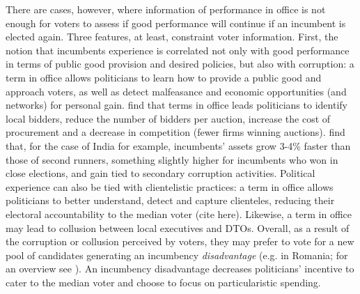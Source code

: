 \documentclass[12pt]{amsart}
\numberwithin{equation}{section}
\theoremstyle{definition}
\theoremstyle{definition}
\theoremstyle{definition}
\begin{document}
There are cases, however, where information of performance in office is not enough for voters to assess if good performance will continue if an incumbent is elected again. Three features, at least, constraint voter information. First, the notion that incumbents experience is correlated not only with good performance in terms of public good provision and desired policies, but also with corruption: a term in office allows politicians to learn how to provide a public good and approach voters, as well as detect malfeasance and economic opportunities (and networks) for personal gain. \citet{coviello_etal_2017} find that terms in office leads politicians to identify local bidders, reduce the number of bidders per auction, increase the cost of procurement and a decrease in competition (fewer firms winning auctions). \citet{fisman_etal_2014} find that, for the case of India for example, incumbents' assets grow 3-4\% faster than those of second runners, something slightly higher for incumbents who won in close elections, and gain tied to secondary corruption activities. Political experience can also be tied with clientelistic practices: a term in office allows politicians to better understand, detect and capture clienteles, reducing their electoral accountability to the median voter (cite here). Likewise, a term in office may lead to collusion between local executives and DTOs. Overall, as a result of the corruption or collusion perceived by voters, they may prefer to vote for a new pool of candidates generating an incumbency \emph{disadvantage} (e.g. \citet{klasnja_2015} in Romania; for an overview see \citet{klasnja_2016}). An incumbency disadvantage decreases politicians' incentive to cater to the median voter and choose to focus on particularistic spending. %
\end{document}

